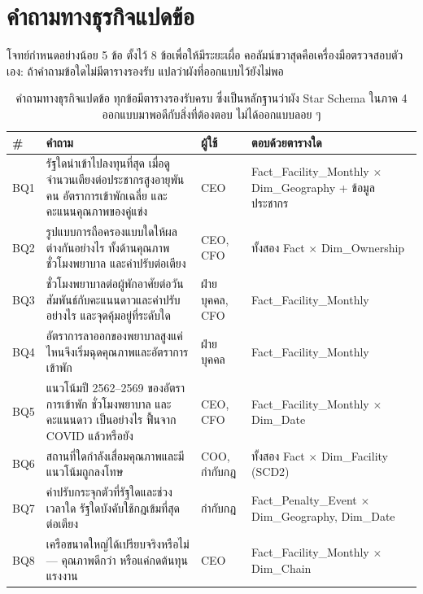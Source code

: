 \documentclass[11pt,a4paper]{article}
\newcommand{\sansall}{\sffamily}
\begin{document}
\section{คำถามทางธุรกิจแปดข้อ}

โจทย์กำหนดอย่างน้อย 5 ข้อ ตั้งไว้ 8 ข้อเพื่อให้มีระยะเผื่อ
คอลัมน์ขวาสุดคือเครื่องมือตรวจสอบตัวเอง: ถ้าคำถามข้อใดไม่มีตารางรองรับ
แปลว่าผังที่ออกแบบไว้ยังไม่พอ

\begin{table}[H]\centering
\begin{adjustbox}{max width=\linewidth}
\small
\begin{tabular}{L{1.0cm} L{8.4cm} L{2.6cm} L{5.4cm}}
\toprule
\sansall\bfseries \# & \sansall\bfseries คำถาม &
\sansall\bfseries ผู้ใช้ & \sansall\bfseries ตอบด้วยตารางใด \\
\midrule
BQ1 & รัฐใดน่าเข้าไปลงทุนที่สุด เมื่อดูจำนวนเตียงต่อประชากรสูงอายุพันคน
      อัตราการเข้าพักเฉลี่ย และคะแนนคุณภาพของคู่แข่ง & CEO &
      Fact\_Facility\_Monthly $\times$ Dim\_Geography + ข้อมูลประชากร \\
\addlinespace
BQ2 & รูปแบบการถือครองแบบใดให้ผลต่างกันอย่างไร ทั้งด้านคุณภาพ ชั่วโมงพยาบาล
      และค่าปรับต่อเตียง & CEO, CFO & ทั้งสอง Fact $\times$ Dim\_Ownership \\
\addlinespace
BQ3 & ชั่วโมงพยาบาลต่อผู้พักอาศัยต่อวันสัมพันธ์กับคะแนนดาวและค่าปรับอย่างไร
      และจุดคุ้มอยู่ที่ระดับใด & ฝ่ายบุคคล, CFO & Fact\_Facility\_Monthly \\
\addlinespace
BQ4 & อัตราการลาออกของพยาบาลสูงแค่ไหนจึงเริ่มฉุดคุณภาพและอัตราการเข้าพัก &
      ฝ่ายบุคคล & Fact\_Facility\_Monthly \\
\addlinespace
BQ5 & แนวโน้มปี 2562--2569 ของอัตราการเข้าพัก ชั่วโมงพยาบาล และคะแนนดาว
      เป็นอย่างไร ฟื้นจาก COVID แล้วหรือยัง & CEO, CFO &
      Fact\_Facility\_Monthly $\times$ Dim\_Date \\
\addlinespace
BQ6 & สถานที่ใดกำลังเสื่อมคุณภาพและมีแนวโน้มถูกลงโทษ & COO, กำกับกฎ &
      ทั้งสอง Fact $\times$ Dim\_Facility (SCD2) \\
\addlinespace
BQ7 & ค่าปรับกระจุกตัวที่รัฐใดและช่วงเวลาใด รัฐใดบังคับใช้กฎเข้มที่สุดต่อเตียง &
      กำกับกฎ & Fact\_Penalty\_Event $\times$ Dim\_Geography, Dim\_Date \\
\addlinespace
BQ8 & เครือขนาดใหญ่ได้เปรียบจริงหรือไม่ --- คุณภาพดีกว่า หรือแค่กดต้นทุนแรงงาน &
      CEO & Fact\_Facility\_Monthly $\times$ Dim\_Chain \\
\bottomrule
\end{tabular}
\end{adjustbox}
\caption{คำถามทางธุรกิจแปดข้อ ทุกข้อมีตารางรองรับครบ ซึ่งเป็นหลักฐานว่าผัง Star Schema ในภาค 4 ออกแบบมาพอดีกับสิ่งที่ต้องตอบ ไม่ได้ออกแบบลอย ๆ}
\end{table}
\end{document}

